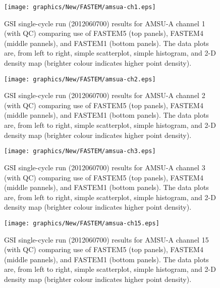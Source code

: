\begin{figure}[H]
  \centering
  \texttt{[image: graphics/New/FASTEM/amsua-ch1.eps]}
  \caption[Effect of FASTEM changes in AMSU-A channel 1]{GSI single-cycle run (2012060700) results for AMSU-A channel 1 (with QC) comparing use of FASTEM5 (top panels), FASTEM4 (middle pannels), and FASTEM1 (bottom panels). The data plots are, from left to right, simple scatterplot, simple histogram, and 2-D density map (brighter colour indicates higher point density).}
  \label{fig:fastem_impact_amsua_ch1}
\end{figure}

\begin{figure}[H]
  \centering
  \texttt{[image: graphics/New/FASTEM/amsua-ch2.eps]}
  \caption[Effect of FASTEM changes in AMSU-A channel 2]{GSI single-cycle run (2012060700) results for AMSU-A channel 2 (with QC) comparing use of FASTEM5 (top panels), FASTEM4 (middle pannels), and FASTEM1 (bottom panels). The data plots are, from left to right, simple scatterplot, simple histogram, and 2-D density map (brighter colour indicates higher point density).}
  \label{fig:fastem_impact_amsua_ch2}
\end{figure}

\begin{figure}[H]
  \centering
  \texttt{[image: graphics/New/FASTEM/amsua-ch3.eps]}
  \caption[Effect of FASTEM changes in AMSU-A channel 3]{GSI single-cycle run (2012060700) results for AMSU-A channel 3 (with QC) comparing use of FASTEM5 (top panels), FASTEM4 (middle pannels), and FASTEM1 (bottom panels). The data plots are, from left to right, simple scatterplot, simple histogram, and 2-D density map (brighter colour indicates higher point density).}
  \label{fig:fastem_impact_amsua_ch3}
\end{figure}

\begin{figure}[H]
  \centering
  \texttt{[image: graphics/New/FASTEM/amsua-ch15.eps]}
  \caption[Effect of FASTEM changes in AMSU-A channel 15]{GSI single-cycle run (2012060700) results for AMSU-A channel 15 (with QC) comparing use of FASTEM5 (top panels), FASTEM4 (middle pannels), and FASTEM1 (bottom panels). The data plots are, from left to right, simple scatterplot, simple histogram, and 2-D density map (brighter colour indicates higher point density).}
  \label{fig:fastem_impact_amsua_ch15}
\end{figure}

